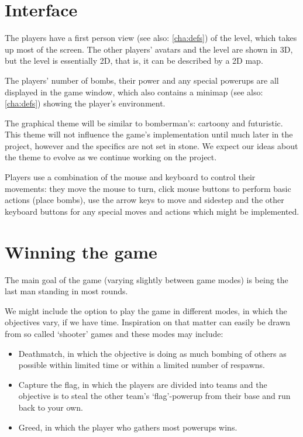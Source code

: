 \documentclass[a4paper,twoside,11pt]{report}
\begin{document}
\chapter{Interface}
The players have a first person view (see also: \ref{cha:defs}) of the level, which takes up most of the screen. The other players' avatars and the level are shown in 3D, but the level is essentially 2D, that is, it can be described by a 2D map.

The players' number of bombs, their power and any special powerups are all displayed in the game window, which also contains a minimap (see also: \ref{cha:defs}) showing the player's environment.

The graphical theme will be similar to bomberman's: cartoony and futuristic. This theme will not influence the game's implementation until much later in the project, however and the specifics are not set in stone. We expect our ideas about the theme to evolve as we continue working on the project.

Players use a combination of the mouse and keyboard to control their movements: they move the mouse to turn, click mouse buttons to perform basic actions (place bombs), use the arrow keys to move and sidestep and the other keyboard buttons for any special moves and actions which might be implemented.

\chapter{Winning the game}
The main goal of the game (varying slightly between game modes) is being the last man standing in most rounds.

We might include the option to play the game in different modes, in which the objectives vary, if we have time. Inspiration on that matter can easily be drawn from so called `shooter' games and these modes may include:

\begin{itemize}
  \item Deathmatch, in which the objective is doing as much bombing of others as possible within limited time or within a limited number of respawns.

  \item Capture the flag, in which the players are divided into teams and the objective is to steal the other team's `flag'-powerup from their base and run back to your own.

  \item Greed, in which the player who gathers most powerups wins.
\end{itemize}
\end{document}
